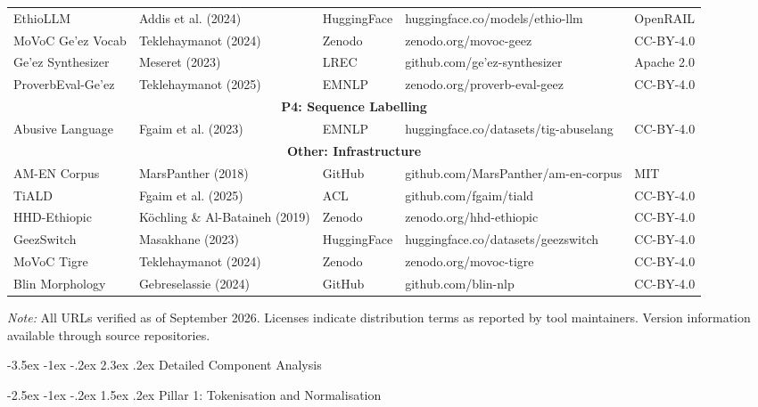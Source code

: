 \documentclass[12pt,a4paper]{article}
\makeatletter
\theoremstyle{plain}
\theoremstyle{definition}
\renewcommand{\section}{\@startsection{section}{1}{\z@}%
  {-3.5ex \@plus -1ex \@minus -.2ex}%
  {2.3ex \@plus.2ex}%
  {\large\bfseries\color{NavyBlue}}}
\renewcommand{\subsection}{\@startsection{subsection}{2}{\z@}%
  {-2.5ex \@plus -1ex \@minus -.2ex}%
  {1.5ex \@plus .2ex}%
  {\normalsize\bfseries\color{DarkGray}}}
\makeatother
\begin{document}
\begin{table}[ht]
\begin{tabularx}{\textwidth}{|l|l|l|l|l|}
EthioLLM & Addis et al. (2024) & HuggingFace & huggingface.co/models/ethio-llm & OpenRAIL \\
MoVoC Ge'ez Vocab & Teklehaymanot (2024) & Zenodo & zenodo.org/movoc-geez & CC-BY-4.0 \\
Ge'ez Synthesizer & Meseret (2023) & LREC & github.com/ge'ez-synthesizer & Apache 2.0 \\
ProverbEval-Ge'ez & Teklehaymanot (2025) & EMNLP & zenodo.org/proverb-eval-geez & CC-BY-4.0 \\
\hline
\multicolumn{5}{|c|}{\textbf{P4: Sequence Labelling}} \\
\hline
Abusive Language & Fgaim et al. (2023) & EMNLP & huggingface.co/datasets/tig-abuselang & CC-BY-4.0 \\
\hline
\multicolumn{5}{|c|}{\textbf{Other: Infrastructure}} \\
\hline
AM-EN Corpus & MarsPanther (2018) & GitHub & github.com/MarsPanther/am-en-corpus & MIT \\
TiALD & Fgaim et al. (2025) & ACL & github.com/fgaim/tiald & CC-BY-4.0 \\
HHD-Ethiopic & Köchling \& Al-Bataineh (2019) & Zenodo & zenodo.org/hhd-ethiopic & CC-BY-4.0 \\
GeezSwitch & Masakhane (2023) & HuggingFace & huggingface.co/datasets/geezswitch & CC-BY-4.0 \\
MoVoC Tigre & Teklehaymanot (2024) & Zenodo & zenodo.org/movoc-tigre & CC-BY-4.0 \\
Blin Morphology & Gebreselassie (2024) & GitHub & github.com/blin-nlp & CC-BY-4.0 \\
\hline
\end{tabularx}
\end{table}

\textit{Note:} All URLs verified as of September 2026. Licenses indicate distribution terms as reported by tool maintainers. Version information available through source repositories.


\section{Detailed Component Analysis}

\subsection{Pillar 1: Tokenisation and Normalisation}
\end{document}
